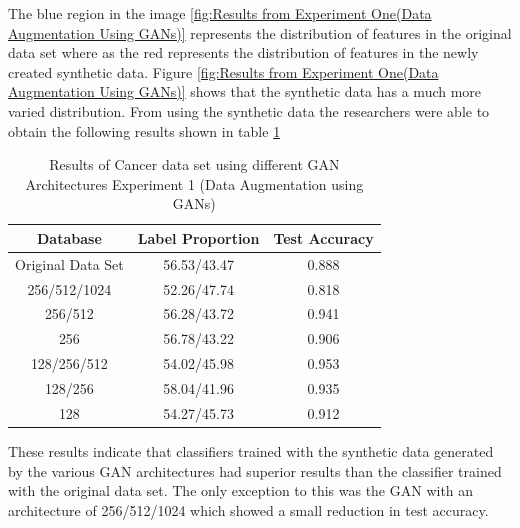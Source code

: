 \vspace{0.5mm}
The blue region in the image \ref{fig:Results from Experiment One(Data Augmentation Using GANs)} represents the distribution of features in the original data set where as the red represents the distribution of features in the newly created synthetic data. Figure \ref{fig:Results from Experiment One(Data Augmentation Using GANs)} shows that the synthetic data has a much more varied distribution.  From using the synthetic data the researchers were able to obtain the following results shown in table \ref{tab:Results and label distribution of Cancer Dataset using different GAN Architectures (Data Augmentation using GANs)}
\begin{table}[H]
    \centering
    \begin{tabular}{|c|c|c|}
    \hline
         Database
         & Label Proportion
         & Test Accuracy\\
    \hline
         Original Data Set & 56.53/43.47 & 0.888\\
         256/512/1024 & 52.26/47.74 & 0.818\\
         256/512 & 56.28/43.72 & 0.941\\
         256 & 56.78/43.22 & 0.906\\
         128/256/512 & 54.02/45.98 & 0.953\\
         128/256 & 58.04/41.96 & 0.935\\
         128 & 54.27/45.73 & 0.912\\
    \hline
    \end{tabular}
    \caption{Results of Cancer data set using different GAN Architectures Experiment 1 (Data Augmentation using GANs)\cite{litReviewGanDataAugmentation}}
    \label{tab:Results and label distribution of Cancer Dataset using different GAN Architectures (Data Augmentation using GANs)}
\end{table}
These results indicate that classifiers trained with the synthetic data generated by the various GAN architectures had superior results than the classifier trained with the original data set.  The only exception to this was the GAN with an architecture of 256/512/1024 which showed a small reduction in test accuracy.
\\
